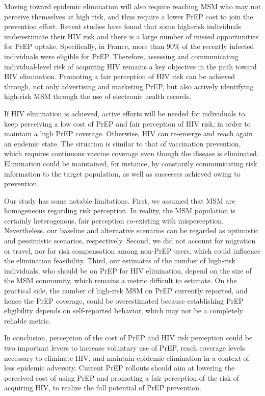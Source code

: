 \documentclass[preprint,review,12pt]{article}			%
\begin{document}
Moving toward epidemic elimination will also require reaching MSM who may not perceive themselves at high risk, and thus require a lower PrEP cost to join the prevention effort. Recent studies have found that some high-risk individuals underestimate their HIV risk\cite{Blumenthal2019} and there is a large number of missed opportunities for PrEP uptake.\cite{Lions2019} Specifically, in France, more than $90\%$ of the recently infected individuals were eligible for PrEP.\cite{Lions2019} Therefore, assessing and communicating individual-level risk of acquiring HIV remains a key objective in the path toward HIV elimination. Promoting a fair perception of HIV risk can be achieved through, not only advertising and marketing PrEP,\cite{Amico2019} but also actively identifying high-risk MSM through the use of electronic health records.\cite{Marcus2019}

If HIV elimination is achieved, active efforts will be needed for individuals to keep perceiving a low cost of PrEP and fair perception of HIV risk, in order to maintain a high PrEP coverage. Otherwise, HIV can re-emerge and reach again an endemic state. The situation is similar to that of vaccination prevention, which requires continuous vaccine coverage even though the disease is eliminated.\cite{Jijon2017} Elimination could be maintained, for instance, by constantly communicating risk information to the target population, as well as successes achieved owing to prevention. 

Our study has some notable limitations. First, we assumed that MSM are homogeneous regarding risk perception. In reality, the MSM population is certainly heterogenous, fair perception co-existing with misperception. Nevertheless, our baseline and alternative scenarios can be regarded as optimistic and pessimistic scenarios, respectively. Second, we did not account for migration or travel,\cite{Palk2018} nor for risk compensation among non-PrEP users,\cite{Phanuphak2018} which could influence the elimination feasibility. Third, our estimates of the number of high-risk individuals, who should be on PrEP for HIV elimination, depend on the size of the MSM community, which remains a metric difficult to estimate. On the practical side, the number of high-risk MSM on PrEP currently reported, and hence the PrEP coverage, could be overestimated because establishing PrEP eligibility depends on self-reported behavior, which may not be a completely reliable metric. 

In conclusion, perception of the cost of PrEP and HIV risk perception could be two important levers to increase voluntary use of PrEP, reach coverage levels necessary to eliminate HIV, and maintain epidemic elimination in a context of less epidemic adversity. Current PrEP rollouts should aim at lowering the perceived cost of using PrEP and promoting a fair perception of the risk of acquiring HIV, to realize the full potential of PrEP prevention.
\end{document}
